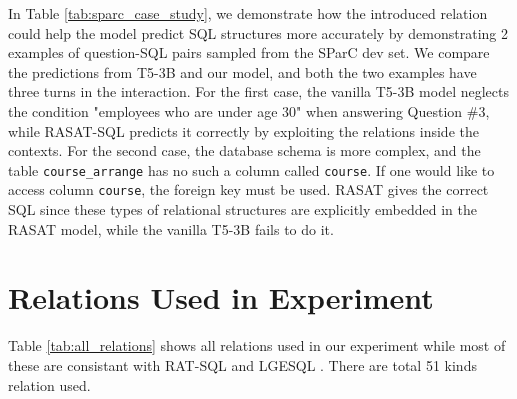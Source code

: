 \documentclass[11pt]{article}
\begin{document}
In Table \ref{tab:sparc_case_study}, we demonstrate how the introduced relation could help the model predict SQL structures more accurately by demonstrating 2 examples of question-SQL pairs sampled from the SParC dev set. We compare the predictions from T5-3B and our model, and both the two examples have three turns in the interaction. For the first case, the vanilla T5-3B model neglects the condition "employees who are under age 30" when answering Question \#3, while RASAT-SQL predicts it correctly by exploiting the relations inside the contexts. For the second case, the database schema is more complex, and the table \texttt{course\_arrange} has no such a column called \texttt{course}. If one would like to access column \texttt{course}, the foreign key must be used. RASAT gives the correct SQL since these types of relational structures are explicitly embedded in the RASAT model, while the vanilla T5-3B fails to do it.










\section{Relations Used in Experiment}
\label{sec:appendix_relation}
Table \ref{tab:all_relations} shows all relations used in our experiment while most of these are consistant with RAT-SQL \citep{wang-etal-2020-rat} and LGESQL \citep{cao-etal-2021-lgesql}. There are total 51 kinds relation used.
\end{document}

